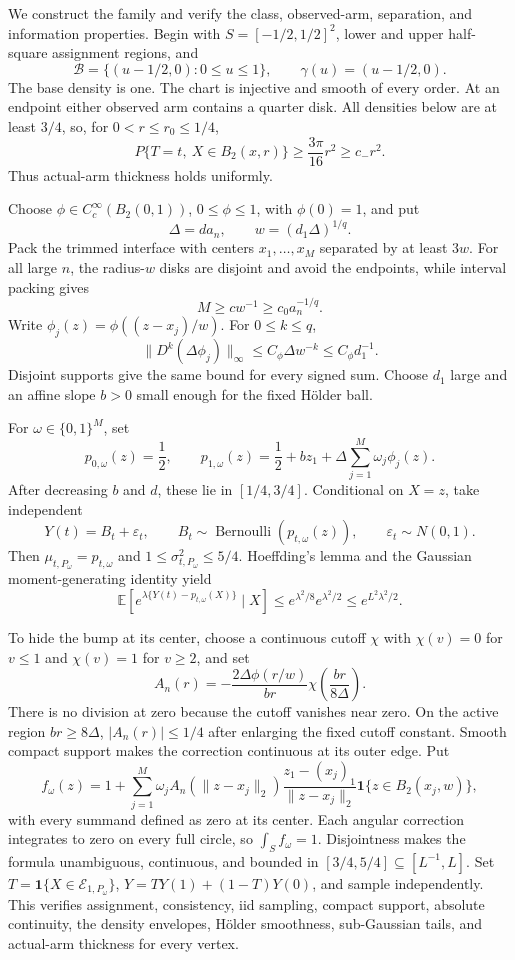We construct the family and verify the class, observed-arm, separation, and information properties.  Begin with \(S=[-1/2,1/2]^2\), lower and upper half-square assignment regions, and
\[
 \mathcal B=\{(u-1/2,0):0\leq u\leq1\},
 \qquad \gamma(u)=(u-1/2,0).
\]
The base density is one.  The chart is injective and smooth of every order.  At an endpoint either observed arm contains a quarter disk.  All densities below are at least \(3/4\), so, for \(0<r\leq r_0\leq1/4\),
\[
 P\{T=t,\ X\in B_2(x,r)\}\geq\frac{3\pi}{16}r^2\geq c_-r^2.
\]
Thus actual-arm thickness holds uniformly.

Choose \(\phi\in C_c^\infty(B_2(0,1))\), \(0\leq\phi\leq1\), with \(\phi(0)=1\), and put
\[
 \Delta=d a_n,
 \qquad w=(d_1\Delta)^{1/q}.
\]
Pack the trimmed interface with centers \(x_1,\ldots,x_M\) separated by at least \(3w\).  For all large \(n\), the radius-\(w\) disks are disjoint and avoid the endpoints, while interval packing gives
\[
 M\geq c w^{-1}\geq c_0a_n^{-1/q}.
\]
Write \(\phi_j(z)=\phi((z-x_j)/w)\).  For \(0\leq k\leq q\),
\[
 \lVert D^k(\Delta\phi_j)\rVert_\infty
 \leq C_\phi\Delta w^{-k}\leq C_\phi d_1^{-1}.
\]
Disjoint supports give the same bound for every signed sum.  Choose \(d_1\) large and an affine slope \(b>0\) small enough for the fixed H\"older ball.

For \(\omega\in\{0,1\}^M\), set
\[
 p_{0,\omega}(z)=\frac12,
 \qquad
 p_{1,\omega}(z)=\frac12+bz_1
 +\Delta\sum_{j=1}^M\omega_j\phi_j(z).
\]
After decreasing \(b\) and \(d\), these lie in \([1/4,3/4]\).  Conditional on \(X=z\), take independent
\[
 Y(t)=B_t+\varepsilon_t,
 \qquad B_t\sim\operatorname{Bernoulli}(p_{t,\omega}(z)),
 \qquad \varepsilon_t\sim N(0,1).
\]
Then \(\mu_{t,P_\omega}=p_{t,\omega}\) and \(1\leq\sigma^2_{t,P_\omega}\leq5/4\).  Hoeffding's lemma and the Gaussian moment-generating identity yield
\[
 \mathbb E\!\left[e^{\lambda\{Y(t)-p_{t,\omega}(X)\}}\mid X\right]
 \leq e^{\lambda^2/8}e^{\lambda^2/2}
 \leq e^{L^2\lambda^2/2}.
\]

To hide the bump at its center, choose a continuous cutoff \(\chi\) with \(\chi(v)=0\) for \(v\leq1\) and \(\chi(v)=1\) for \(v\geq2\), and set
\[
 A_n(r)=-\frac{2\Delta\phi(r/w)}{br}
 \chi\!\left(\frac{br}{8\Delta}\right).
\]
There is no division at zero because the cutoff vanishes near zero.  On the active region \(br\geq8\Delta\), \(|A_n(r)|\leq1/4\) after enlarging the fixed cutoff constant.  Smooth compact support makes the correction continuous at its outer edge.  Put
\[
 f_\omega(z)=1+\sum_{j=1}^M\omega_j
 A_n(\lVert z-x_j\rVert_2)
 \frac{z_1-(x_j)_1}{\lVert z-x_j\rVert_2}
 \mathbf1\{z\in B_2(x_j,w)\},
\]
with every summand defined as zero at its center.  Each angular correction integrates to zero on every full circle, so \(\int_Sf_\omega=1\).  Disjointness makes the formula unambiguous, continuous, and bounded in \([3/4,5/4]\subseteq[L^{-1},L]\).  Set \(T=\mathbf1\{X\in\mathcal E_{1,P_\omega}\}\), \(Y=TY(1)+(1-T)Y(0)\), and sample independently.  This verifies assignment, consistency, iid sampling, compact support, absolute continuity, the density envelopes, H\"older smoothness, sub-Gaussian tails, and actual-arm thickness for every vertex.

